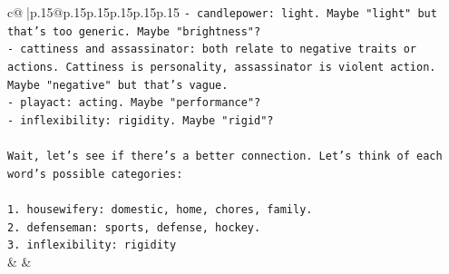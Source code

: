\documentclass{article}
\begin{document}
{\begin{supertabular}{c@{$\;$}|p{.15\linewidth}@{}p{.15\linewidth}p{.15\linewidth}p{.15\linewidth}p{.15\linewidth}p{.15\linewidth}}
{{{\texttt{{-} candlepower: light. Maybe "light" but that's too generic. Maybe "brightness"?} \\
\texttt{{-} cattiness and assassinator: both relate to negative traits or actions. Cattiness is personality, assassinator is violent action. Maybe "negative" but that's vague.} \\
\texttt{{-} playact: acting. Maybe "performance"?} \\
\texttt{{-} inflexibility: rigidity. Maybe "rigid"?} \\
\\ 
\texttt{Wait, let's see if there's a better connection. Let's think of each word's possible categories:} \\
\\ 
\texttt{1. housewifery: domestic, home, chores, family.} \\
\texttt{2. defenseman: sports, defense, hockey.} \\
\texttt{3. inflexibility: rigidity} \\
            }
        }
    }
    & & \\ \\


\end{supertabular}}
\end{document}
